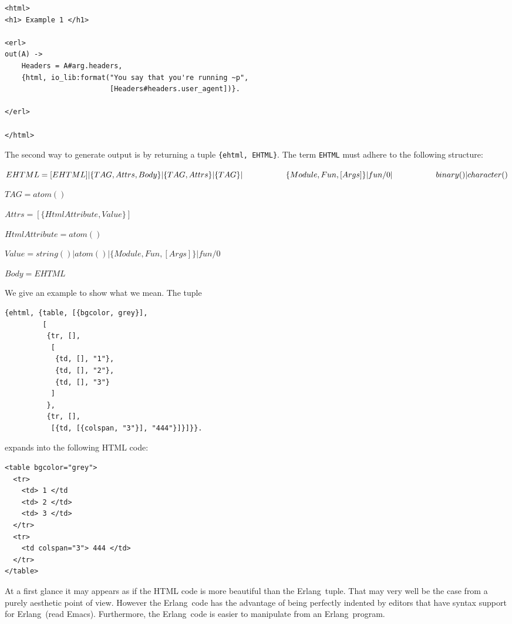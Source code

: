 \documentclass[11pt,oneside,english]{book}
\newcommand{\Erlang}            %
        {{\sc Erlang}}
\begin{document}
\begin{verbatim}
<html>
<h1> Example 1 </h1>

<erl>
out(A) ->
    Headers = A#arg.headers,
    {html, io_lib:format("You say that you're running ~p",
                         [Headers#headers.user_agent])}.

</erl>

</html>

\end{verbatim}


The second way to generate output is by returning a tuple
\verb+{ehtml, EHTML}+. The term \verb+EHTML+ must adhere to the
following structure:

$EHTML = [EHTML] | \{TAG, Attrs, Body\} |
               \{TAG, Attrs\} | \{TAG\} |\\*
\hspace*{0.75 in} \{Module, Fun, [Args]\} | fun/0 |\\*
\hspace*{0.75 in} binary() | character()$

$TAG   = atom()$

$Attrs = [\{HtmlAttribute, Value\}]$

$HtmlAttribute = atom()$

$Value = string() | atom() |
         \{Module, Fun, [Args]\} | fun/0$

$Body  = EHTML$

We give an example to show what we mean. The tuple

\begin{verbatim}
{ehtml, {table, [{bgcolor, grey}],
         [
          {tr, [],
           [
            {td, [], "1"},
            {td, [], "2"},
            {td, [], "3"}
           ]
          },
          {tr, [],
           [{td, [{colspan, "3"}], "444"}]}]}}.
\end{verbatim}

expands into the following HTML code:

\begin{verbatim}
<table bgcolor="grey">
  <tr>
    <td> 1 </td
    <td> 2 </td>
    <td> 3 </td>
  </tr>
  <tr>
    <td colspan="3"> 444 </td>
  </tr>
</table>

\end{verbatim}

At a first glance it may appears as if the HTML code is more beautiful
than the \Erlang\ tuple. That may very well be the case from a purely
aesthetic point of view. However the \Erlang\ code has the advantage
of being perfectly indented by editors that have syntax support for
\Erlang\ (read Emacs). Furthermore, the \Erlang\ code is easier to
manipulate from an \Erlang\ program.
\end{document}
